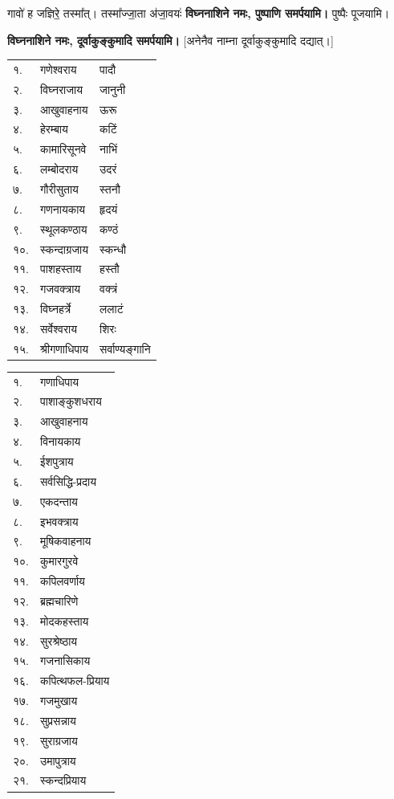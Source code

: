 \begin{center}
{गावो॑ ह जज्ञिरे॒ तस्मा᳚त्। तस्मा᳚ज्जा॒ता अ॑जा॒वयः॑}
\textbf{विघ्ननाशिने नमः, पुष्पाणि समर्पयामि।} पुष्पैः पूजयामि।

\textbf{विघ्ननाशिने नमः, दूर्वाकुङ्कुमादि समर्पयामि।}
[अनेनैव नाम्ना दूर्वाकुङ्कुमादि दद्यात्।]

\begin{longtable}{ll@{~नमः — }l@{~पूजयामि}}
    १. & गणेश्वराय & पादौ\\
    २. & विघ्नराजाय & जानुनी\\
    ३. & आखुवाहनाय & ऊरू\\
    ४. & हेरम्बाय & कटिं\\
    ५. & कामारिसूनवे & नाभिं\\
    ६. & लम्बोदराय & उदरं\\
    ७. & गौरीसुताय & स्तनौ\\
    ८. & गणनायकाय & हृदयं\\
    ९. & स्थूलकण्ठाय & कण्ठं\\
    १०. & स्कन्दाग्रजाय & स्कन्धौ\\
    ११. & पाशहस्ताय & हस्तौ\\
    १२. & गजवक्त्राय & वक्त्रं\\
    १३. & विघ्नहर्त्रे & ललाटं\\
    १४. & सर्वेश्वराय & शिरः\\
    १५. & श्रीगणाधिपाय & सर्वाण्यङ्गानि\\
\end{longtable}

\begin{longtable}{ll@{~नमः — दूर्वायुग्मं समर्पयामि।}}
    १. & गणाधिपाय\\
    २. & पाशाङ्कुशधराय\\
    ३. & आखुवाहनाय\\
    ४. & विनायकाय\\
    ५. & ईशपुत्राय\\
    ६. & सर्वसिद्धि-प्रदाय\\
    ७. & एकदन्ताय\\
    ८. & इभवक्त्राय\\
    ९. & मूषिकवाहनाय\\
    १०. & कुमारगुरवे\\
    ११. & कपिलवर्णाय\\
    १२. & ब्रह्मचारिणे\\
    १३. & मोदकहस्ताय\\
    १४. & सुरश्रेष्ठाय\\
    १५. & गजनासिकाय\\
    १६. & कपित्थफल-प्रियाय\\
    १७. & गजमुखाय\\
    १८. & सुप्रसन्नाय\\
    १९. & सुराग्रजाय\\
    २०. & उमापुत्राय\\
    २१. & स्कन्दप्रियाय\\
\end{longtable}


\end{center}
